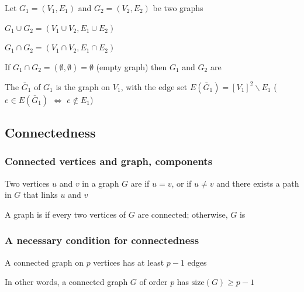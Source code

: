 \documentclass[aspectratio=43]{beamer}
\begin{document}
\begin{frame}
Let $G_1=(V_1,E_1)$ and $G_2=(V_2,E_2)$ be two graphs
\begin{definition}
$G_1\cup G_2=(V_1\cup V_2,E_1\cup E_2)$
\end{definition}
\begin{definition}
$G_1\cap G_2=(V_1\cap V_2,E_1\cap E_2)$
\end{definition}
\begin{definition}
If $G_1\cap G_2=(\emptyset,\emptyset)= \emptyset$ (empty graph) then $G_1$ and $G_2$ are 
\end{definition}
\begin{definition}[{Complement of $G_1$}]
The  $\bar G_1$ of $G_1$ is the graph on $V_1$, with the edge set $E(\bar G_1)=[V_1]^2\backslash E_1$ ($e\in E(\bar G_1)$ $\iff$ $e\not \in E_1$)
\end{definition}
\end{frame}



\subsection{Connectedness}

\begin{frame}\frametitle{Connected vertices and graph, components}
\begin{definition}
Two vertices $u$ and $v$ in a graph $G$ are  if $u=v$, or if $u\not =v$ and there exists a path in $G$ that links $u$ and $v$
\end{definition}
\vfill
\begin{definition}
A graph is  if every two vertices of $G$ are connected; otherwise, $G$ is 
\end{definition}
\end{frame}

\begin{frame}\frametitle{A necessary condition for connectedness}
	\begin{theorem}
		A connected graph on $p$ vertices has at least $p-1$ edges
	\end{theorem}
	\vfill
	In other words, a connected graph $G$ of order $p$ has $\text{size}(G)\geq p-1$
\end{frame}
\end{document}

